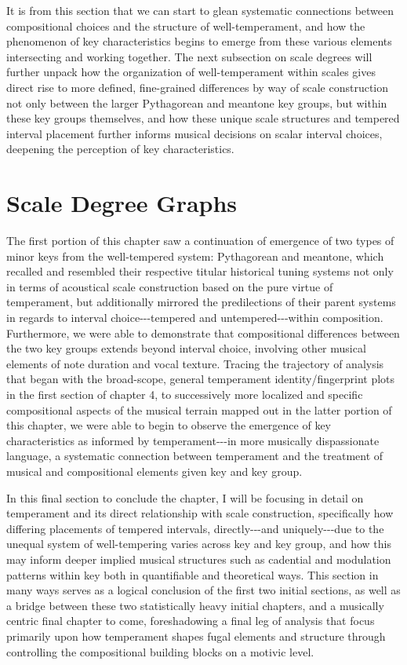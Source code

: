 It is from this section that we can start to glean systematic
connections between compositional choices and the structure of
well-temperament, and how the phenomenon of key characteristics begins
to emerge from these various elements intersecting and working together.
The next subsection on scale degrees will further unpack how the
organization of well-temperament within scales gives direct rise to more
defined, fine-grained differences by way of scale construction not only
between the larger Pythagorean and meantone key groups, but within these
key groups themselves, and how these unique scale structures and
tempered interval placement further informs musical decisions on scalar
interval choices, deepening the perception of key characteristics.

    \section{Scale Degree Graphs}\label{scale-degree-graphs}

The first portion of this chapter saw a continuation of emergence of two
types of minor keys from the well-tempered system: Pythagorean and
meantone, which recalled and resembled their respective titular
historical tuning systems not only in terms of acoustical scale
construction based on the pure virtue of temperament, but additionally
mirrored the predilections of their parent systems in regards to
interval choice-\/-\/-tempered and untempered-\/-\/-within composition.
Furthermore, we were able to demonstrate that compositional differences
between the two key groups extends beyond interval choice, involving
other musical elements of note duration and vocal texture. Tracing the
trajectory of analysis that began with the broad-scope, general
temperament identity/fingerprint plots in the first section of chapter
4, to successively more localized and specific compositional aspects of
the musical terrain mapped out in the latter portion of this chapter, we
were able to begin to observe the emergence of key characteristics as
informed by temperament-\/-\/-in more musically dispassionate language,
a systematic connection between temperament and the treatment of musical
and compositional elements given key and key group.

In this final section to conclude the chapter, I will be focusing in
detail on temperament and its direct relationship with scale
construction, specifically how differing placements of tempered
intervals, directly-\/-\/-and uniquely-\/-\/-due to the unequal system
of well-tempering varies across key and key group, and how this may
inform deeper implied musical structures such as cadential and
modulation patterns within key both in quantifiable and theoretical
ways. This section in many ways serves as a logical conclusion of the
first two initial sections, as well as a bridge between these two
statistically heavy initial chapters, and a musically centric final
chapter to come, foreshadowing a final leg of analysis that focus
primarily upon how temperament shapes fugal elements and structure
through controlling the compositional building blocks on a motivic
level.

